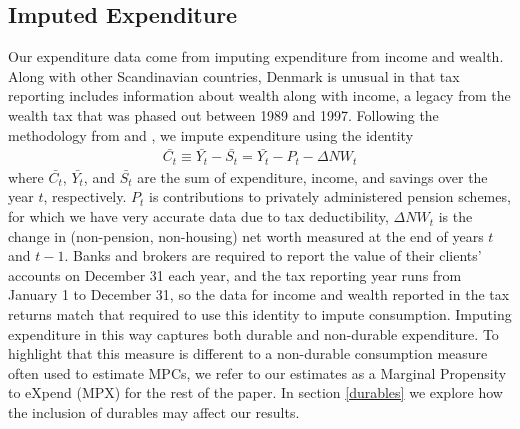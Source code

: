 \documentclass[titlepage]{\econtex}\newcommand{\texname}{ConsumptionHeterogeneity}
\begin{document}
	\subsection{Imputed Expenditure} \label{cons_imputation}
	 Our expenditure data come from imputing expenditure from income and wealth. Along with other Scandinavian countries, Denmark is unusual in that tax reporting includes information about wealth along with income, a legacy from the wealth tax that was phased out between 1989 and 1997. Following the methodology from \cite{browning_imputing_2003} and \cite{fagereng_imputing_2015}, we impute expenditure using the identity
	\begin{align*}
	\bar{C_t} \equiv \bar{Y_t} - \bar{S_t} = \bar{Y_t} - P_t - \Delta NW_t 
	\end{align*}
	where $\bar{C_t}$, $\bar{Y_t}$, and $\bar{S_t}$  are the sum of expenditure, income, and savings over the year $t$, respectively. $P_t$ is contributions to privately administered pension schemes, for which we have very accurate data due to tax deductibility, $\Delta NW_t$ is the change in (non-pension, non-housing) net worth measured at the end of years $t$ and $t-1$. Banks and brokers are required to report the value of their clients' accounts on December 31 each year, and the tax reporting year runs from January 1 to December 31, so the data for income and wealth reported in the tax returns match that required to use this identity to impute consumption. Imputing expenditure in this way captures both durable and non-durable expenditure. To highlight that this measure is different to a non-durable consumption measure often used to estimate MPCs, we refer to our estimates as a Marginal Propensity to eXpend (MPX) for the rest of the paper. In section \ref{durables} we explore how the inclusion of durables may affect our results.
	
\end{document}
